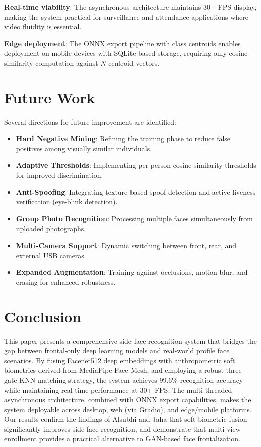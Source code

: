 \documentclass[conference]{IEEEtran}
\begin{document}
\textbf{Real-time viability}: The asynchronous architecture maintains 30+ FPS display, making the system practical for surveillance and attendance applications where video fluidity is essential.

\textbf{Edge deployment}: The ONNX export pipeline with class centroids enables deployment on mobile devices with SQLite-based storage, requiring only cosine similarity computation against $N$ centroid vectors.

\section{Future Work}

Several directions for future improvement are identified:

\begin{itemize}
\item \textbf{Hard Negative Mining}: Refining the training phase to reduce false positives among visually similar individuals.
\item \textbf{Adaptive Thresholds}: Implementing per-person cosine similarity thresholds for improved discrimination.
\item \textbf{Anti-Spoofing}: Integrating texture-based spoof detection and active liveness verification (eye-blink detection).
\item \textbf{Group Photo Recognition}: Processing multiple faces simultaneously from uploaded photographs.
\item \textbf{Multi-Camera Support}: Dynamic switching between front, rear, and external USB cameras.
\item \textbf{Expanded Augmentation}: Training against occlusions, motion blur, and erasing for enhanced robustness.
\end{itemize}

\section{Conclusion}

This paper presents a comprehensive side face recognition system that bridges the gap between frontal-only deep learning models and real-world profile face scenarios. By fusing Facenet512 deep embeddings with anthropometric soft biometrics derived from MediaPipe Face Mesh, and employing a robust three-gate KNN matching strategy, the system achieves 99.6\% recognition accuracy while maintaining real-time performance at 30+ FPS. The multi-threaded asynchronous architecture, combined with ONNX export capabilities, makes the system deployable across desktop, web (via Gradio), and edge/mobile platforms. Our results confirm the findings of Alsubhi and Jaha \cite{b4} that soft biometric fusion significantly improves side face recognition, and demonstrate that multi-view enrollment provides a practical alternative to GAN-based face frontalization.
\end{document}
